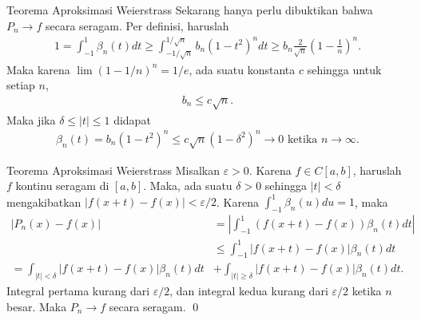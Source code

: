 \documentclass[xcolor={dvipsnames}, 9pt]{beamer}
\begin{document}
    \begin{frame}{Teorema Aproksimasi Weierstrass}
        Sekarang hanya perlu dibuktikan bahwa $P_n\to f$ secara seragam. Per definisi, haruslah
        \begin{align*}
            1=\int_{-1}^1 \beta_n(t)dt \geq \int_{-1/\sqrt{n}}^{1/\sqrt{n}} b_n(1-t^2)^n dt \geq b_n \frac{2}{\sqrt{n}}\left(1-\frac{1}{n}\right)^n.
        \end{align*}
        Maka karena $\lim (1-1/n)^n = 1/e$, ada suatu konstanta $c$ sehingga untuk setiap $n$,
        \begin{align*}
            b_n \leq c\sqrt{n}.
        \end{align*}
        Maka jika $\delta\leq|t|\leq 1$ didapat
        \begin{align*}
            \beta_n(t) = b_n(1-t^2)^n \leq c\sqrt{n}(1-\delta^2)^n\to 0 \text{ ketika } n\to\infty.
        \end{align*}
    \end{frame}
    \begin{frame}{Teorema Aproksimasi Weierstrass}
        Misalkan $\varepsilon>0$. Karena $f\in C[a,b]$, haruslah $f$ kontinu seragam di $[a,b]$. Maka, ada suatu $\delta>0$ sehingga $|t|<\delta$ mengakibatkan $|f(x+t)-f(x)|<\varepsilon/2$. Karena $\int_{-1}^{1} \beta_n(u) du = 1$, maka
        \begin{align*}
            |P_n(x)-f(x)| &= \left|\int_{-1}^1 (f(x+t)-f(x))\beta_n(t) dt\right| \\
            &\leq \int_{-1}^1 |f(x+t)-f(x)|\beta_n(t) dt \\
            = \int_{|t|<\delta} |f(x+t)-f(x)|\beta_n(t) dt &+\int_{|t|\geq\delta} |f(x+t)-f(x)|\beta_n(t) dt.
        \end{align*}
        Integral pertama kurang dari $\varepsilon/2$, dan integral kedua kurang dari $\varepsilon/2$ ketika $n$ besar. Maka $P_n\to f$ secara seragam. \qed
    \end{frame}
\end{document}
